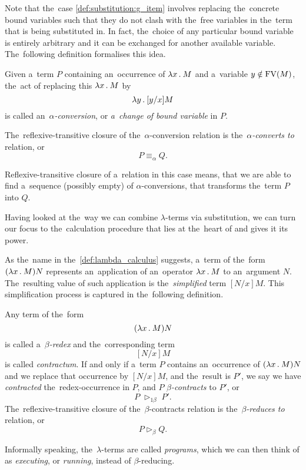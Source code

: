 Note that the~case \ref{def:substitution:g_item} involves replacing the~concrete
bound variables such that they do not clash with the~free variables in the~term
that is being substituted in. In fact, the~choice of any particular bound
variable is entirely arbitrary and it can be exchanged for another available
variable. The~following definition formalises this idea.

\begin{definition}
  Given a~term $P$ containing an~occurrence of $\lambda x \, . \: M$ and a~variable $y
  \notin \mathrm{FV}(M)$, the~act of replacing this $\lambda x \, . \: M$ by
  \[
    \lambda y \, . \: [y/x]M
  \]
  is called an~\emph{$\alpha$-conversion}, or \emph{a~change of bound variable}
  in $P$.

  The~reflexive-transitive closure of the~$\alpha$-conversion relation is
  the~\emph{$\alpha$-converts to} relation, or
  \[
    P \equiv_\alpha Q.
  \]
\end{definition}

Reflexive-transitive closure of a~relation in this case means, that we are able
to find a~sequence (possibly empty) of $\alpha$-conversions, that transforms
the~term $P$ into $Q$.

Having looked at the~way we can combine $\lambda$-terms via substitution, we can
turn our focus to the~calculation procedure that lies at the~heart of \lc and
gives it its power.


As the~name in the~\autoref{def:lambda_calculus} suggests, a~term of
the~form $(\lambda x \, . \: M) N$ represents an~application of an~operator $\lambda x \, . \: M$ to
an~argument $N$. The~resulting value of such application is the~\emph{simplified}
term $[N/x]M$. This simplification process is captured in the~following
definition.

\begin{definition}
  Any term of the~form
  \[
    (\lambda x \, . \: M) N
  \]
  is called a~\emph{$\beta$-redex} and the~corresponding term
  \[
    [N/x]M
  \]
  is called \emph{contractum}. If and only if a~term $P$ contains an~occurrence
  of $(\lambda x \, . \: M) N$ and we replace that occurrence by $[N/x]M$, and the~result
  is $P'$, we say we have \emph{contracted} the~redex-occurrence in $P$, and $P$
  \emph{$\beta$-contracts} to $P'$, or
  \[
    P \; \triangleright_{1\beta} \; P'.
  \]
  The~reflexive-transitive closure of the~$\beta$-contracts relation is
  the~\emph{$\beta$-reduces to} relation, or
  \[
    P \triangleright_\beta Q.
  \]
\end{definition}

Informally speaking, the~$\lambda$-terms are called \emph{programs}, which we
can then think of as \emph{executing}, or \emph{running}, instead of
$\beta$-reducing.

